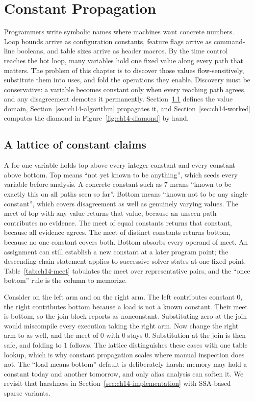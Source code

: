 \chapter{Constant Propagation}
\label{ch:ch14-constant-propagation}

Programmers write symbolic names where machines want concrete numbers.
Loop bounds arrive as configuration constants, feature flags arrive as command-line booleans, and table sizes arrive as header macros.
By the time control reaches the hot loop, many variables hold one fixed value along every path that matters.
The problem of this chapter is to discover those values flow-sensitively, substitute them into uses, and fold the operations they enable.
Discovery must be conservative: a variable becomes constant only when every reaching path agrees, and any disagreement demotes it permanently.
Section~\ref{sec:ch14-lattice} defines the value domain, Section~\ref{sec:ch14-algorithm} propagates it, and Section~\ref{sec:ch14-worked} computes the diamond in Figure~\ref{fig:ch14-diamond} by hand.

\section{A lattice of constant claims}
\label{sec:ch14-lattice}

A  for one variable holds top above every integer constant and every constant above bottom.
Top means \enquote{not yet known to be anything}, which seeds every variable before analysis.
A concrete constant such as $7$ means \enquote{known to be exactly this on all paths seen so far}.
Bottom means \enquote{known not to be any single constant}, which covers disagreement as well as genuinely varying values.
The meet of top with any value returns that value, because an unseen path contributes no evidence.
The meet of equal constants returns that constant, because all evidence agrees.
The meet of distinct constants returns bottom, because no one constant covers both.
Bottom absorbs every operand of meet.
An assignment can still establish a new constant at a later program point; the descending-chain statement applies to successive solver states at one fixed point.
Table~\ref{tab:ch14-meet} tabulates the meet over representative pairs, and the \enquote{once bottom} rule is the column to memorize.

Consider  on the left arm and  on the right arm.
The left contributes constant $0$, the right contributes bottom because a load is not a known constant.
Their meet is bottom, so the join block reports  as nonconstant.
Substituting zero at the join would miscompile every execution taking the right arm.
Now change the right arm to  as well, and the meet of $0$ with $0$ stays $0$.
Substitution at the join is then safe, and folding  to $1$ follows.
The lattice distinguishes these cases with one table lookup, which is why constant propagation scales where manual inspection does not.
The \enquote{load means bottom} default is deliberately harsh: memory may hold a constant today and another tomorrow, and only alias analysis can soften it.
We revisit that harshness in Section~\ref{sec:ch14-implementation} with SSA-based sparse variants.

